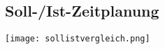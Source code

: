 \subsection{Soll-/Ist-Zeitplanung}
\label{sec:Anhang:sollistvergleich}
\texttt{[image: sollistvergleich.png]}